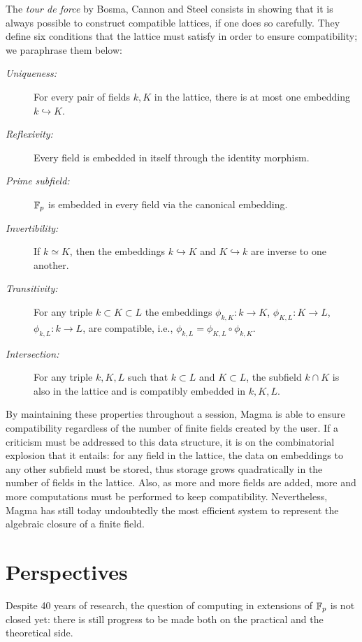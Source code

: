 \documentclass{report}
\theoremstyle{plain}
\theoremstyle{definition}
\begin{document}
The \emph{tour de force} by Bosma, Cannon and Steel consists in
showing that it is always possible to construct compatible lattices,
if one does so carefully. %
They define six conditions that the lattice must satisfy in order to
ensure compatibility; we paraphrase them below:
\begin{description}
\item[\emph{Uniqueness:}] For every pair of fields $k,K$ in the lattice,
  there is at most one embedding $k\hookrightarrow K$.
\item[\emph{Reflexivity:}] Every field is embedded in itself through
  the identity morphism.
\item[\emph{Prime subfield:}] $\mathbb{F}_p$ is embedded in every field via the
  canonical embedding.
\item[\emph{Invertibility:}] If $k≃K$, then the embeddings
  $k\hookrightarrow K$ and $K\hookrightarrow k$ are inverse to one
  another.
\item[\emph{Transitivity:}] For any triple $k⊂K⊂L$ the embeddings
  $ϕ_{k,K}:k→K$, $ϕ_{K,L}:K→L$, $ϕ_{k,L}:k→L$, are compatible, i.e.,
  $ϕ_{k,L}=ϕ_{K,L}∘ϕ_{k,K}$.
\item[\emph{Intersection:}] For any triple $k,K,L$ such that $k⊂L$ and
  $K⊂L$, the subfield $k∩K$ is also in the lattice and is compatibly
  embedded in $k,K,L$.
\end{description}

By maintaining these properties throughout a session, Magma is able to
ensure compatibility regardless of the number of finite fields created
by the user. %
If a criticism must be addressed to this data structure, it is on the
combinatorial explosion that it entails: for any field in the lattice,
the data on embeddings to any other subfield must be stored, thus
storage grows quadratically in the number of fields in the lattice. %
Also, as more and more fields are added, more and more computations
must be performed to keep compatibility. %
Nevertheless, Magma has still today undoubtedly the most efficient
system to represent the algebraic closure of a finite field. %


\section{Perspectives}

Despite 40 years of research, the question of computing in extensions
of $\mathbb{F}_p$ is not closed yet: there is still progress to be made both
on the practical and the theoretical side. %
\end{document}
